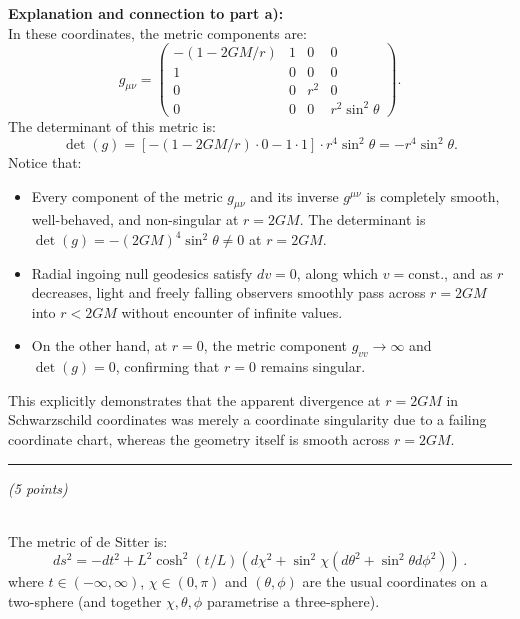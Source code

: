 \documentclass[12pt]{article}
\newcommand{\be}{\begin{equation}}
\newcommand{\ee}{\end{equation}}
\newcounter{quesno}
\newcommand{\ques}[1]{\vspace{2em}\stepcounter{quesno}
\noindent{\bf Question \thequesno.} \emph{(#1 points)\\}
}
\begin{document}
\begin{enumerate}[label=\alph*)]
\noindent\textbf{Explanation and connection to part a):}\\
In these coordinates, the metric components are:
\begin{equation}
g_{\mu\nu} = \begin{pmatrix}
-(1 - 2GM/r) & 1 & 0 & 0 \\
1 & 0 & 0 & 0 \\
0 & 0 & r^2 & 0 \\
0 & 0 & 0 & r^2\sin^2\theta
\end{pmatrix}.
\end{equation}
The determinant of this metric is:
\begin{equation}
\det(g) = \left[ -(1 - 2GM/r) \cdot 0 - 1 \cdot 1 \right] \cdot r^4 \sin^2\theta = - r^4 \sin^2\theta.
\end{equation}
Notice that:
\begin{itemize}
\item Every component of the metric $g_{\mu\nu}$ and its inverse $g^{\mu\nu}$ is completely smooth, well-behaved, and non-singular at $r = 2GM$. The determinant is $\det(g) = - (2GM)^4 \sin^2\theta \neq 0$ at $r = 2GM$.
\item Radial ingoing null geodesics satisfy $dv = 0$, along which $v = \text{const.}$, and as $r$ decreases, light and freely falling observers smoothly pass across $r = 2GM$ into $r < 2GM$ without encounter of infinite values.
\item On the other hand, at $r = 0$, the metric component $g_{vv} \to \infty$ and $\det(g) = 0$, confirming that $r=0$ remains singular.
\end{itemize}
This explicitly demonstrates that the apparent divergence at $r = 2GM$ in Schwarzschild coordinates was merely a coordinate singularity due to a failing coordinate chart, whereas the geometry itself is smooth across $r = 2GM$.
\end{enumerate}

\vspace{1.5em}
\hrule

\ques{5}
\\
The metric of de Sitter is:
\be
ds^2 =- dt^2 +  L^2  \cosh^2 (t/L) \left( d\chi^2 + \sin^2 \chi \left( d\theta^2 + \sin^2\theta d\phi^2 \right)\right)  \,.
\label{dsmetric} 
\ee
where $t \in (-\infty, \infty)$, $\chi \in (0,\pi)$ and $(\theta,\phi)$ are the usual coordinates on a two-sphere (and together $\chi, \theta,\phi$ parametrise a three-sphere).
\end{document}
